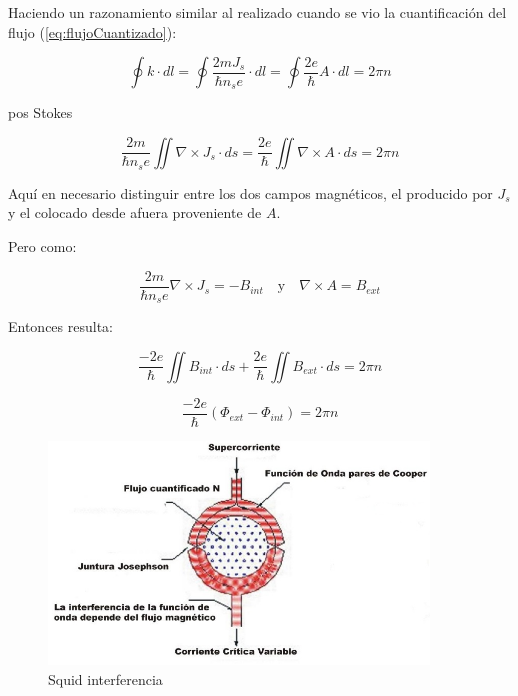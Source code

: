 Haciendo un razonamiento similar al realizado cuando se vio la cuantificación del flujo (\ref{eq:flujoCuantizado}):

\begin{equation*}
	\oint k \cdot dl = \oint \frac{2mJ_{s}}{\hbar n_{s} e} \cdot  dl = \oint \frac{2e}{\hbar} A \cdot dl = 2\pi n
\end{equation*}

pos Stokes

\begin{equation*}
	\frac{2m}{\hbar n_{s} e} \iint \nabla \times J_{s} \cdot  ds  = \frac{2e}{\hbar} \iint \nabla \times A \cdot ds = 2\pi n
\end{equation*}

Aquí en necesario distinguir entre los dos campos magnéticos, el producido por $J_{s}$ y el colocado desde afuera proveniente de $A$.

Pero como:

\begin{equation*}
	\frac{2m}{\hbar n_{s} e} \nabla \times J_{s}   = -B_{int} \quad \text{y} \quad  \nabla \times A = B_{ext}
\end{equation*}

Entonces resulta:

\begin{equation*}
	\frac{-2e}{\hbar} \iint B_{int} \cdot  ds  + \frac{2e}{\hbar} \iint B_{ext} \cdot ds = 2\pi n
\end{equation*}

\begin{equation*}
	\frac{-2e}{\hbar}(\Phi_{ext}-\Phi_{int} ) = 2\pi n
\end{equation*}

\begin{figure}[H]
    \centering
    \includegraphics[width=0.9\textwidth]{./Figures/fig442a}
	\caption{Squid interferencia}
	\label{fig:442a}
\end{figure}

